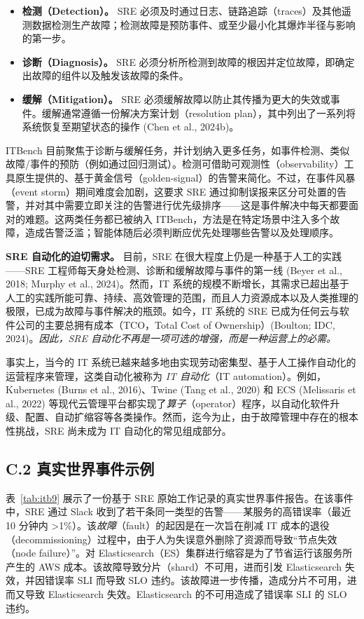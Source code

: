 \documentclass[10pt,UTF8,fontset=fandol]{ctexart}
\begin{document}
\begin{itemize}
\item \textbf{检测（Detection）。} SRE 必须及时通过日志、链路追踪（traces）及其他遥测数据检测生产故障；检测故障是预防事件、或至少最小化其爆炸半径与影响的第一步。
\item \textbf{诊断（Diagnosis）。} SRE 必须分析所检测到故障的根因并定位故障，即确定出故障的组件以及触发该故障的条件。
\item \textbf{缓解（Mitigation）。} SRE 必须缓解故障以防止其传播为更大的失效或事件。缓解通常遵循一份解决方案计划（resolution plan），其中列出了一系列将系统恢复至期望状态的操作 (Chen et al., 2024b)。
\end{itemize}

ITBench 目前聚焦于诊断与缓解任务，并计划纳入更多任务，如事件检测、类似故障/事件的预防（例如通过回归测试）。检测可借助可观测性（observability）工具原生提供的、基于黄金信号（golden-signal）的告警来简化。不过，在事件风暴（event storm）期间难度会加剧，这要求 SRE 通过抑制误报来区分可处置的告警，并对其中需要立即关注的告警进行优先级排序——这是事件解决中每天都要面对的难题。这两类任务都已被纳入 ITBench，方法是在特定场景中注入多个故障，造成告警泛滥；智能体随后必须判断应优先处理哪些告警以及处理顺序。

\textbf{SRE 自动化的迫切需求。} 目前，SRE 在很大程度上仍是一种基于人工的实践——SRE 工程师每天身处检测、诊断和缓解故障与事件的第一线 (Beyer et al., 2018; Murphy et al., 2024)。然而，IT 系统的规模不断增长，其需求已超出基于人工的实践所能可靠、持续、高效管理的范围，而且人力资源成本以及人类推理的极限，已成为故障与事件解决的瓶颈。如今，IT 系统的 SRE 已成为任何云与软件公司的主要总拥有成本（TCO，Total Cost of Ownership）(Boulton; IDC, 2024)。\textit{因此，SRE 自动化不再是一项可选的增强，而是一种运营上的必需。}

事实上，当今的 IT 系统已越来越多地由实现劳动密集型、基于人工操作自动化的运营程序来管理，这类自动化被称为 \textit{IT 自动化}（IT automation）。例如，Kubernetes (Burns et al., 2016)、Twine (Tang et al., 2020) 和 ECS (Melissaris et al., 2022) 等现代云管理平台都实现了\textit{算子}（operator）程序，以自动化软件升级、配置、自动扩缩容等各类操作。然而，迄今为止，由于故障管理中存在的根本性挑战，SRE 尚未成为 IT 自动化的常见组成部分。

\subsection{C.2 真实世界事件示例}

表~\ref{tab:itb9} 展示了一份基于 SRE 原始工作记录的真实世界事件报告。在该事件中，SRE 通过 Slack 收到了若干条同一类型的告警——某服务的高错误率（最近 10 分钟内 >1\%）。该\textit{故障}（fault）的起因是在一次旨在削减 IT 成本的退役（decommissioning）过程中，由于人为失误意外删除了资源而导致“节点失效（node failure）”。对 Elasticsearch（ES）集群进行缩容是为了节省运行该服务所产生的 AWS 成本。该故障导致分片（shard）不可用，进而引发 Elasticsearch 失效，并因错误率 SLI 而导致 SLO 违约。该故障进一步传播，造成分片不可用，进而又导致 Elasticsearch 失效。Elasticsearch 的不可用造成了错误率 SLI 的 SLO 违约。
\end{document}

